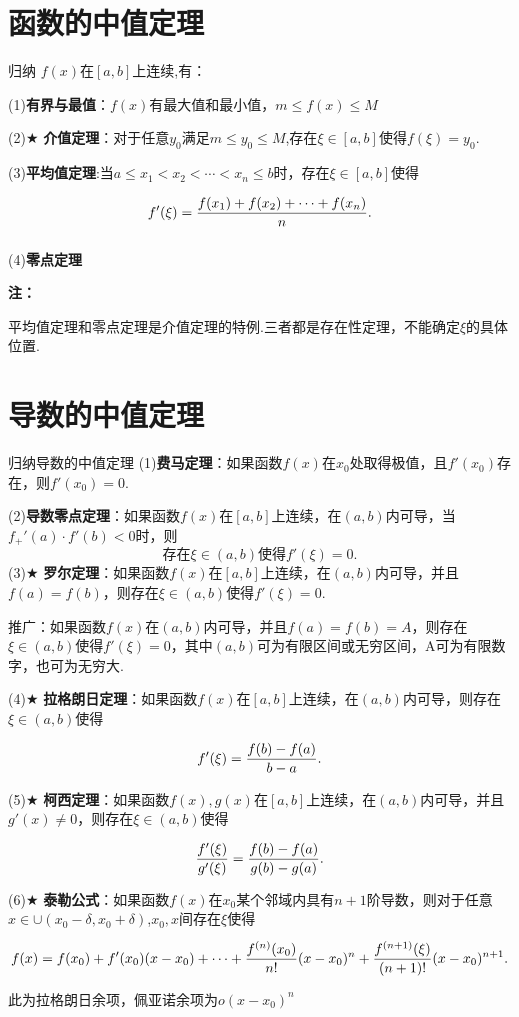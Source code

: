 \documentclass[a4paper,12pt,oneside,fontset=none]{ctexbook}
\renewcommand{\leq}{\leqslant}
\let\olddfrac\dfrac
\renewcommand{\dfrac}[2]{
    \olddfrac{#1\vrule width 0pt height 1.15em depth 0em}{#2\vrule width 0pt height 0em depth 0.6em}
}
\newenvironment{induction}[1][]{\begin{thmBox}{归纳}{#1}}{\end{thmBox}}
\newenvironment{note}{
    \par\vspace{0.5em}\noindent
    \textbf{\color{NoteColor} 注：}
}{
    \par\vspace{0.5em}
}
\numberwithin{equation}{chapter}
\begin{document}
\section{函数的中值定理}
\begin{induction}
    $f(x)$在$[a,b]$上连续,有：

    (1)\textbf{有界与最值}：$f(x)$有最大值和最小值，$m\leq f(x)\leq M$

    (2)$\bigstar$ \textbf{介值定理}：对于任意$y_0$满足$m\leq y_0\leq M$,存在$\xi\in[a,b]$使得$f(\xi)=y_0$.

    (3)\textbf{平均值定理}:当$a\leq x_1 < x_2 < \cdots < x_n\leq b$时，存在$\xi\in[a,b]$使得
    \[
        f'(\xi) = \dfrac{f(x_1) + f(x_2) + \cdots + f(x_n)}{n}.
    \]

    (4)\textbf{零点定理}
\end{induction}
\begin{note}
    平均值定理和零点定理是介值定理的特例.三者都是存在性定理，不能确定$\xi$的具体位置.
\end{note}


\section{导数的中值定理}
\begin{induction}[导数的中值定理]
    (1)\textbf{费马定理}：如果函数$f(x)$在$x_0$处取得极值，且$f'(x_0)$存在，则$f'(x_0)=0$.

    (2)\textbf{导数零点定理}：如果函数$f(x)$在$[a,b]$上连续，在$(a,b)$内可导，当$f_+'(a)\cdot f'(b) < 0$时，则
    \[
        \text{存在}\xi\in(a,b)\text{使得}f'(\xi)=0.
    \]
    (3)$\bigstar$ \textbf{罗尔定理}：如果函数$f(x)$在$[a,b]$上连续，在$(a,b)$内可导，并且$f(a)=f(b)$，则存在$\xi\in(a,b)$使得$f'(\xi)=0$.

    推广：如果函数$f(x)$在$(a,b)$内可导，并且$f(a)=f(b)=A$，则存在$\xi\in(a,b)$使得$f'(\xi)=0$，其中$(a,b)$可为有限区间或无穷区间，A可为有限数字，也可为无穷大.

    (4)$\bigstar$ \textbf{拉格朗日定理}：如果函数$f(x)$在$[a,b]$上连续，在$(a,b)$内可导，则存在$\xi\in(a,b)$使得
    \[
        f'(\xi) = \dfrac{f(b) - f(a)}{b - a}.
    \]
    (5)$\bigstar$ \textbf{柯西定理}：如果函数$f(x), g(x)$在$[a,b]$上连续，在$(a,b)$内可导，并且$g'(x)\neq 0$，则存在$\xi\in(a,b)$使得
    \[
        \dfrac{f'(\xi)}{g'(\xi)} = \dfrac{f(b) - f(a)}{g(b) - g(a)}.
    \]
    (6)$\bigstar$ \textbf{泰勒公式}：如果函数$f(x)$在$x_0$某个邻域内具有$n+1$阶导数，则对于任意$x\in\cup(x_0-\delta, x_0+\delta)$,$x_0,x$间存在$\xi$使得
    \[
        f(x) = f(x_0) + f'(x_0)(x-x_0) + \cdots + \dfrac{f^{(n)}(x_0)}{n!}(x-x_0)^n + \dfrac{f^{(n+1)}(\xi)}{(n+1)!}(x-x_0)^{n+1}.
    \]
    此为拉格朗日余项，佩亚诺余项为$o(x-x_0)^{n}$
\end{induction}
\end{document}
